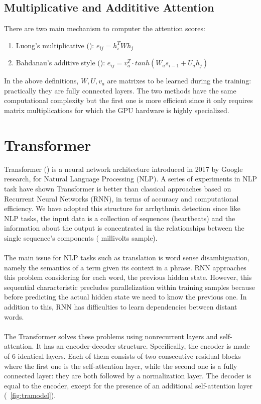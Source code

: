 \documentclass[LaM,binding=0.6cm]{sapthesis}
\begin{document}
\subsection{Multiplicative and Addititive Attention}
There are two main mechanism to computer the attention scores:
\begin{enumerate}
\item Luong's multiplicative (\cite{luong}): $e_{ij} = h_{i}^{T}Wh_{j}$
\item Bahdanau's additive style (\cite{psy}): $e_{ij} = v_{a}^{T} \cdot tanh(W_{a}s_{i-1} + U_{a}h_j)$
\end{enumerate}
In the above definitions, $W,U,v_a$ are matrixes to be learned during the training: practically they are fully connected layers. The two methods have the same computational complexity but the first one is more efficient since it only requires matrix multiplications for which the GPU hardware is highly specialized.



\section{Transformer}
Transformer (\cite{aiayn}) is a neural network architecture introduced in 2017 by Google research, for Natural Language Processing (NLP). A series of experiments in NLP task have shown Transformer is better than classical approaches based on Recurrent Neural Networks (RNN), in terms of accuracy and computational efficiency. We have adopted this structure for arrhythmia detection since like NLP tasks, the input data is a collection of sequences  (heartbeats) and the information about the output is concentrated in the relationships between the single sequence's components ( millivolts sample).\\\\The main issue for NLP tasks such as translation is word sense disambiguation, namely the semantics of a term given its context in a phrase. RNN approaches this problem considering for each word, the previous hidden state. However, this sequential characteristic precludes parallelization within training samples because before predicting the actual hidden state we need to know the previous one. In addition to this, RNN has difficulties to learn dependencies between distant words.\\\\The Transformer solves these problems using nonrecurrent layers and self-attention. It has an encoder-decoder structure. Specifically, the encoder is made of 6 identical layers. Each of them consists of two consecutive residual blocks where the first one is the self-attention layer, while the second one is a fully connected layer: they are both followed by a normalization layer. The decoder is equal to the encoder, except for the presence of an additional self-attention layer (~\ref{fig:tramodel}).
\end{document}
